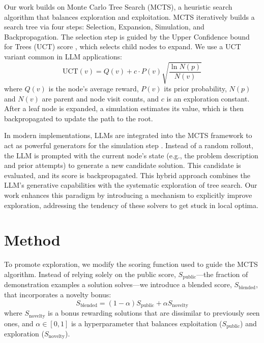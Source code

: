 \documentclass{article} %
\begin{document}
Our work builds on Monte Carlo Tree Search (MCTS), a heuristic search algorithm that balances exploration and exploitation. MCTS iteratively builds a search tree via four steps: Selection, Expansion, Simulation, and Backpropagation. The selection step is guided by the Upper Confidence bound for Trees (UCT) score \citep{Kocsis2006BanditBM}, which selects child nodes to expand. We use a UCT variant common in LLM applications:
\begin{equation} \label{eq:uct}
\text{UCT}(v) = Q(v) + c \cdot P(v) \sqrt{\frac{\ln N(p)}{N(v)}}
\end{equation}
where $Q(v)$ is the node's average reward, $P(v)$ its prior probability, $N(p)$ and $N(v)$ are parent and node visit counts, and $c$ is an exploration constant. After a leaf node is expanded, a simulation estimates its value, which is then backpropagated to update the path to the root.

In modern implementations, LLMs are integrated into the MCTS framework to act as powerful generators for the simulation step \citep{abmcts}. Instead of a random rollout, the LLM is prompted with the current node's state (e.g., the problem description and prior attempts) to generate a new candidate solution. This candidate is evaluated, and its score is backpropagated. This hybrid approach combines the LLM's generative capabilities with the systematic exploration of tree search. Our work enhances this paradigm by introducing a mechanism to explicitly improve exploration, addressing the tendency of these solvers to get stuck in local optima.

\section{Method}
\label{sec:method}
To promote exploration, we modify the scoring function used to guide the MCTS algorithm. Instead of relying solely on the public score, $S_{\text{public}}$—the fraction of demonstration examples a solution solves—we introduce a blended score, $S_{\text{blended}}$, that incorporates a novelty bonus:
\begin{equation} \label{eq:blended_score}
S_{\text{blended}} = (1-\alpha)S_{\text{public}} + \alpha S_{\text{novelty}}
\end{equation}
where $S_{\text{novelty}}$ is a bonus rewarding solutions that are dissimilar to previously seen ones, and $\alpha \in [0, 1]$ is a hyperparameter that balances exploitation ($S_{\text{public}}$) and exploration ($S_{\text{novelty}}$).
\end{document}
